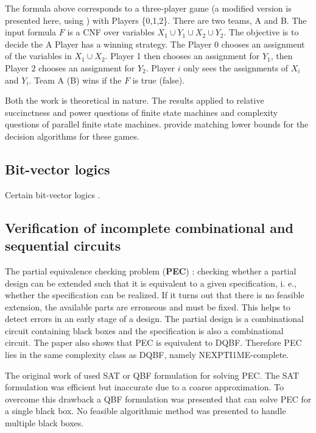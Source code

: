 \documentclass[runningheads]{llncs}
\begin{document}
The formula above corresponds to a three-player game (a modified version is presented here, using \cite{hearn06}) with Players \{0,1,2\}.
There are two teams, A and B.
The input formula $F$ is a CNF over variables $X_1 \cup Y_1 \cup X_2 \cup Y_2$.
The objective is to decide the A Player has a winning strategy.
The Player 0 chooses an assignment of the variables in $X_1 \cup X_2$.
Player 1 then chooses an assignment for $Y_1$, then Player 2 chooses an assignment for $Y_2$.
Player $i$ only sees the assignments of $X_i$ and $Y_i$. Team A (B) wins if the $F$ is true (false).

Both the work \cite{petersonr79, peterson2001lower} is theoretical in nature. The results applied to relative succinctness and power questions of finite state machines and complexity questions of parallel finite state machines.
\cite{peterson2001lower} provide matching lower bounds for the decision algorithms for these games.

\subsection{Bit-vector logics}\label{subsec:bitvectors}
Certain bit-vector logics \cite{kovasznaifb12, wintersteigerhm13}.

\subsection{Verification of incomplete combinational and sequential circuits}\label{subsec:pec}

The partial equivalence checking problem (\textbf{PEC}) \cite{gitinarswb13r}: checking whether a partial design can be extended
such that it is equivalent to a given specification, i. e., whether the specification can be realized.
If it turns out that there is no feasible extension, the available parts are erroneous and must be fixed. This helps to detect errors in an early stage of a design.
The partial design is a combinational circuit containing
black boxes and the specification is also a combinational circuit.
The paper also shows that PEC is equivalent to DQBF. Therefore PEC lies in the same complexity class as DQBF, namely NEXPTI1ME-complete.

The original work of \cite{schollb01} used SAT or QBF formulation for solving PEC. The SAT formulation was
efficient but inaccurate due to a coarse
approximation.
To overcome this drawback a QBF formulation was presented that can solve PEC for a single black box.
No feasible algorithmic method was presented to handle multiple black boxes.
\end{document}
